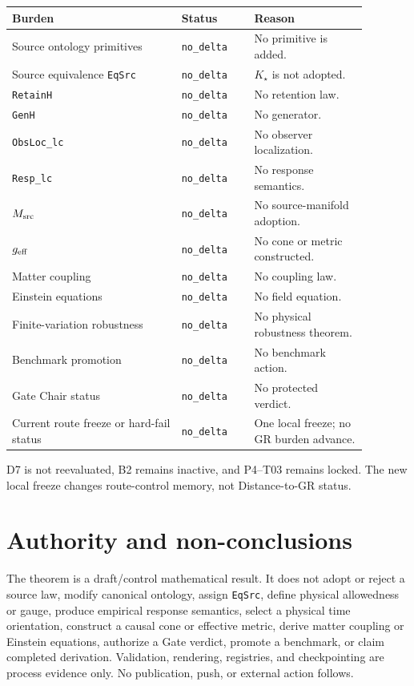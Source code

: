 \documentclass[11pt]{article}
\newcommand{\Kstar}{K_{\star}}
\newcommand{\NoDelta}{\texttt{no\_delta}}
\begin{document}
\begin{center}
\small
\begin{tabular}{>{\raggedright\arraybackslash}p{0.42\linewidth}
                >{\raggedright\arraybackslash}p{0.18\linewidth}
                >{\raggedright\arraybackslash}p{0.28\linewidth}}
\toprule
Burden & Status & Reason \\
\midrule
Source ontology primitives & \NoDelta{} & No primitive is added. \\
Source equivalence \texttt{EqSrc} & \NoDelta{} & $\Kstar$ is not adopted. \\
\texttt{RetainH} & \NoDelta{} & No retention law. \\
\texttt{GenH} & \NoDelta{} & No generator. \\
\texttt{ObsLoc\_lc} & \NoDelta{} & No observer localization. \\
\texttt{Resp\_lc} & \NoDelta{} & No response semantics. \\
$M_{\rm src}$ & \NoDelta{} & No source-manifold adoption. \\
$g_{\rm eff}$ & \NoDelta{} & No cone or metric constructed. \\
Matter coupling & \NoDelta{} & No coupling law. \\
Einstein equations & \NoDelta{} & No field equation. \\
Finite-variation robustness & \NoDelta{} & No physical robustness theorem. \\
Benchmark promotion & \NoDelta{} & No benchmark action. \\
Gate Chair status & \NoDelta{} & No protected verdict. \\
Current route freeze or hard-fail status & \NoDelta{} & One local freeze; no GR burden advance. \\
\bottomrule
\end{tabular}
\end{center}

D7 is not reevaluated, B2 remains inactive, and P4--T03 remains locked.  The
new local freeze changes route-control memory, not Distance-to-GR status.

\section{Authority and non-conclusions}

The theorem is a draft/control mathematical result.  It does not adopt or
reject a source law, modify canonical ontology, assign \texttt{EqSrc}, define
physical allowedness or gauge, produce empirical response semantics, select a
physical time orientation, construct a causal cone or effective metric,
derive matter coupling or Einstein equations, authorize a Gate verdict,
promote a benchmark, or claim completed derivation.  Validation, rendering,
registries, and checkpointing are process evidence only.  No publication,
push, or external action follows.
\end{document}
